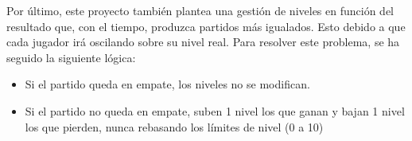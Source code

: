 Por último, este proyecto también plantea una gestión de niveles en función del resultado que, con el tiempo, produzca partidos más igualados. Esto debido a que cada jugador irá oscilando sobre su nivel real.
Para resolver este problema, se ha seguido la siguiente lógica:

\begin{itemize}
    \item Si el partido queda en empate, los niveles no se modifican.
    \item Si el partido no queda en empate, suben 1 nivel los que ganan y bajan 1 nivel los que pierden, nunca rebasando los límites de nivel (0 a 10)
    
\end{itemize}
